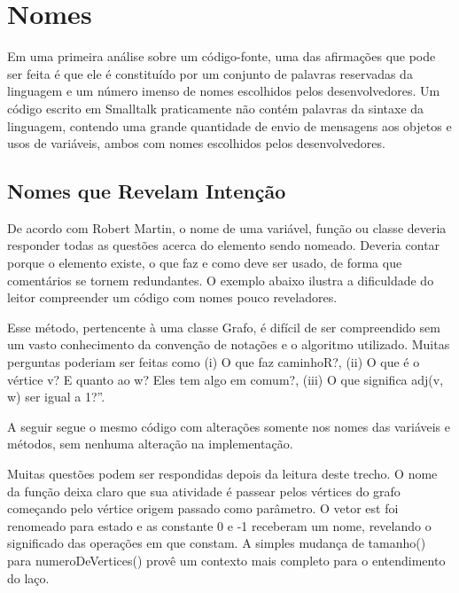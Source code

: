 \section{Nomes}
\label{sec:nomes}

Em uma primeira análise sobre um código-fonte, uma das afirmações que pode ser feita é que ele é constituído por um conjunto de palavras reservadas da linguagem e um número imenso de nomes escolhidos pelos desenvolvedores. Um código escrito em Smalltalk praticamente não contém palavras da sintaxe da linguagem, contendo uma grande quantidade de envio de mensagens aos objetos e usos de variáveis, ambos com nomes escolhidos pelos desenvolvedores.

\subsection{Nomes que Revelam Intenção}
De acordo com Robert Martin, o nome de uma variável, função ou classe deveria responder todas as questões acerca do elemento sendo nomeado. Deveria contar porque o elemento existe, o que faz e como deve ser usado, de forma que comentários se tornem redundantes. O exemplo abaixo ilustra a dificuldade do leitor compreender um código com nomes pouco reveladores.



Esse método, pertencente à uma classe Grafo, é difícil de ser compreendido sem um vasto conhecimento da convenção de notações e o algoritmo utilizado. Muitas perguntas poderiam ser feitas como (i) O que faz caminhoR?,  (ii) O que é o vértice v?  E quanto ao w? Eles tem algo em comum?, (iii)  O que significa adj(v, w) ser igual a 1?”.

A seguir segue o mesmo código com alterações somente nos nomes das variáveis e métodos, sem nenhuma alteração na implementação.



Muitas questões podem ser respondidas depois da leitura deste trecho. O nome da função deixa claro que sua atividade é passear pelos vértices do grafo começando pelo vértice origem passado como parâmetro. O vetor est foi renomeado para estado e as constante 0 e -1 receberam um nome, revelando o significado das operações em que constam. A simples mudança de tamanho() para numeroDeVertices() provê um contexto mais completo para o entendimento do laço.
	
